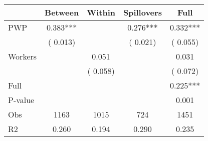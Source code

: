 
\begin{tabular}{l*{4}{c}}\hline&\multicolumn{1}{c}{Between}&\multicolumn{1}{c}{Within}&\multicolumn{1}{c}{Spillovers}&\multicolumn{1}{c}{Full}\\ \hline
 PWP           &              0.383***      &                                               &        0.276*** &         0.332***                            \\ 
                               &        (       0.013)           &                                       &       (       0.021)     &      (       0.055)                                           \\ 
 Workers       &                                               &        0.051    &                                &             0.031                            \\ 
                               &                                               & (       0.058)                  &                                        &      (       0.072)                                           \\ 
\hline                                                                                                                                                                                                                                            
 Full                  &                                               &                                               &                                        &             0.225***                                     \\ 
 P-value               &                                               &                                               &                                        &             0.001                                           \\ 
 Obs                   &               1163               &       1015                       &       724                &              1451                                               \\ 
 R2                    &                      0.260              &              0.194                      &              0.290               &                     0.235                                              \\ 
\hline \end{tabular}                                                                                                                                                                                                              